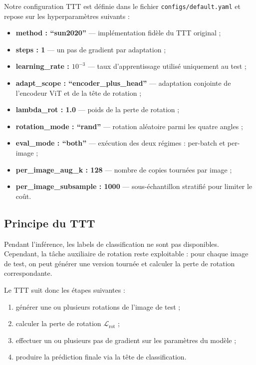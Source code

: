 \documentclass[12pt,a4paper]{report}
\begin{document}
	Notre configuration TTT est définie dans le fichier \texttt{configs/default.yaml} et repose sur les hyperparamètres suivants :
	\begin{itemize}
		\item \textbf{method : ``sun2020''} — implémentation fidèle du TTT original ;
		\item \textbf{steps : 1} — un pas de gradient par adaptation ;
		\item \textbf{learning\_rate : $10^{-3}$} — taux d’apprentissage utilisé uniquement au test ;
		\item \textbf{adapt\_scope : ``encoder\_plus\_head''} — adaptation conjointe de l’encodeur ViT et de la tête de rotation ;
		\item \textbf{lambda\_rot : 1.0} — poids de la perte de rotation ;
		\item \textbf{rotation\_mode : ``rand''} — rotation aléatoire parmi les quatre angles ;
		\item \textbf{eval\_mode : ``both''} — exécution des deux régimes : per-batch et per-image ;
		\item \textbf{per\_image\_aug\_k : 128} — nombre de copies tournées par image ;
		\item \textbf{per\_image\_subsample : 1000} — sous-échantillon stratifié pour limiter le coût.
	\end{itemize}
	
	\subsection{Principe du TTT}
	
	Pendant l’inférence, les labels de classification ne sont pas disponibles.  
	Cependant, la tâche auxiliaire de rotation reste exploitable : pour chaque image de test, on peut générer une version tournée et calculer la perte de rotation correspondante.
	
	Le TTT suit donc les étapes suivantes :
	\begin{enumerate}
		\item générer une ou plusieurs rotations de l’image de test ;
		\item calculer la perte de rotation $\mathcal{L}_{\text{rot}}$ ;
		\item effectuer un ou plusieurs pas de gradient sur les paramètres du modèle ;
		\item produire la prédiction finale via la tête de classification.
	\end{enumerate}
	
\end{document}
